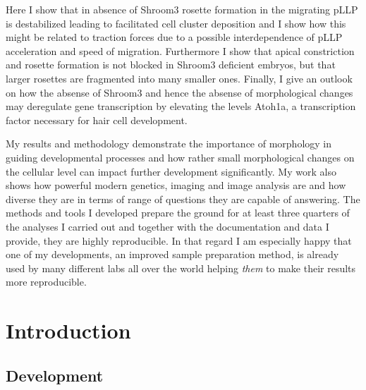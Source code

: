 \documentclass[11pt,singlespacinge,twoside]{reedthesis} %
\theoremstyle{definition}
\theoremstyle{definition}
\theoremstyle{definition}
\theoremstyle{remark}
\begin{document}
Here I show that in absence of Shroom3 rosette formation in the migrating pLLP is destabilized leading to facilitated cell cluster deposition and I show how this might be related to traction forces due to a possible interdependence of pLLP acceleration and speed of migration. Furthermore I show that apical constriction and rosette formation is not blocked in Shroom3 deficient embryos, but that larger rosettes are fragmented into many smaller ones. Finally, I give an outlook on how the absense of Shroom3 and hence the absense of morphological changes may deregulate gene transcription by elevating the levels Atoh1a, a transcription factor necessary for hair cell development.

My results and methodology demonstrate the importance of morphology in guiding developmental processes and how rather small morphological changes on the cellular level can impact further development significantly. My work also shows how powerful modern genetics, imaging and image analysis are and how diverse they are in terms of range of questions they are capable of answering. The methods and tools I developed prepare the ground for at least three quarters of the analyses I carried out and together with the documentation and data I provide, they are highly reproducible. In that regard I am especially happy that one of my developments, an improved sample preparation method, is already used by many different labs all over the world helping \emph{them} to make their results more reproducible.

\hypertarget{Intro}{%
\chapter{Introduction}\label{Intro}}

\setcounter{page}{1}

\hypertarget{development}{%
\section{Development}\label{development}}
\end{document}
